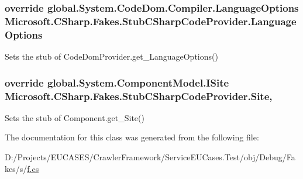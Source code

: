 \hypertarget{class_microsoft_1_1_c_sharp_1_1_fakes_1_1_stub_c_sharp_code_provider_ab385150b148683872adcdcdf4dc44691}{
\subsubsection[{Language\-Options}]{\setlength{\rightskip}{0pt plus 5cm}override global.\-System.\-Code\-Dom.\-Compiler.\-Language\-Options Microsoft.\-C\-Sharp.\-Fakes.\-Stub\-C\-Sharp\-Code\-Provider.\-Language\-Options\hspace{0.3cm}{\ttfamily [get]}}}\label{class_microsoft_1_1_c_sharp_1_1_fakes_1_1_stub_c_sharp_code_provider_ab385150b148683872adcdcdf4dc44691}


Sets the stub of Code\-Dom\-Provider.\-get\-\_\-\-Language\-Options()

\hypertarget{class_microsoft_1_1_c_sharp_1_1_fakes_1_1_stub_c_sharp_code_provider_a2c94554f13cbb114ada22e33e8d1a098}{
\subsubsection[{Site}]{\setlength{\rightskip}{0pt plus 5cm}override global.\-System.\-Component\-Model.\-I\-Site Microsoft.\-C\-Sharp.\-Fakes.\-Stub\-C\-Sharp\-Code\-Provider.\-Site\hspace{0.3cm}{\ttfamily [get]}, {\ttfamily [set]}}}\label{class_microsoft_1_1_c_sharp_1_1_fakes_1_1_stub_c_sharp_code_provider_a2c94554f13cbb114ada22e33e8d1a098}


Sets the stub of Component.\-get\-\_\-\-Site()



The documentation for this class was generated from the following file\-:\begin{DoxyCompactItemize}
\item 
D\-:/\-Projects/\-E\-U\-C\-A\-S\-E\-S/\-Crawler\-Framework/\-Service\-E\-U\-Cases.\-Test/obj/\-Debug/\-Fakes/s/\hyperlink{s_2f_8cs}{f.\-cs}\end{DoxyCompactItemize}
